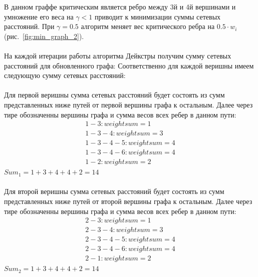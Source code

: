 \documentclass[12pt]{article}
\begin{document}
В данном граффе критическим является ребро между
3й и 4й вершинами и умножение его веса на
$\gamma < 1$ приводит к минимизации суммы сетевых расстояний.
При $\gamma = 0.5$ алгоритм меняет вес критического ребра на $0.5 \cdot w_i$ (рис.~\ref{fig:min_graph_2}).

\paragraph{}

На каждой итерации работы алгоритма Дейкстры получим сумму сетевых расстояний для обновленного графа:
Соответственно для каждой веришны имеем следующую сумму сетевых расстояний:

\paragraph{}

Для первой веришны сумма сетевых расстояний будет состоять из сумм представленных ниже 
путей от первой вершины графа к остальным.
Далее через тире обозначенны вершины графа и сумма весов всех ребер в данном пути:
\begin{gather}
1 - 3 : weight sum = 1 \\
1 - 3 - 4 : weight sum = 3 \\
1 - 3 - 4 - 5 : weight sum = 4 \\
1 - 3 - 4 - 6 : weight sum = 4 \\
1 - 2 : weight sum = 2
\end{gather}
$Sum_1 = 1 + 3 + 4 + 4 + 2 = 14$

\paragraph{}

Для второй веришны сумма сетевых расстояний будет состоять из сумм представленных ниже 
путей от второй вершины графа к остальным.
Далее через тире обозначенны вершины графа и сумма весов всех ребер в данном пути:
\begin{gather}
2 - 3 : weight sum = 1 \\
2 - 3 - 4 : weight sum = 3 \\
2 - 3 - 4 - 5 : weight sum = 4 \\
2 - 3 - 4 - 6 : weight sum = 4 \\
2 - 1 : weight sum = 2
\end{gather}
$Sum_2 = 1 + 3 + 4 + 4 + 2 = 14$

\paragraph{}
\end{document}
